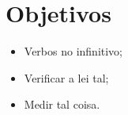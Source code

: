 \chapter{Objetivos}

\begin{itemize}
\item Verbos no infinitivo;
\item Verificar a lei tal;
\item Medir tal coisa.
\end{itemize}
